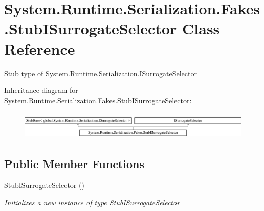 \hypertarget{class_system_1_1_runtime_1_1_serialization_1_1_fakes_1_1_stub_i_surrogate_selector}{\section{System.\-Runtime.\-Serialization.\-Fakes.\-Stub\-I\-Surrogate\-Selector Class Reference}
\label{class_system_1_1_runtime_1_1_serialization_1_1_fakes_1_1_stub_i_surrogate_selector}
}


Stub type of System.\-Runtime.\-Serialization.\-I\-Surrogate\-Selector 


Inheritance diagram for System.\-Runtime.\-Serialization.\-Fakes.\-Stub\-I\-Surrogate\-Selector\-:\begin{figure}[H]
\begin{center}
\leavevmode
\includegraphics[height=1.379310cm]{class_system_1_1_runtime_1_1_serialization_1_1_fakes_1_1_stub_i_surrogate_selector}
\end{center}
\end{figure}
\subsection*{Public Member Functions}
\begin{DoxyCompactItemize}
\item 
\hyperlink{class_system_1_1_runtime_1_1_serialization_1_1_fakes_1_1_stub_i_surrogate_selector_ab14fe849b382670ce977cb507998b147}{Stub\-I\-Surrogate\-Selector} ()
\begin{DoxyCompactList}\small\item\em Initializes a new instance of type \hyperlink{class_system_1_1_runtime_1_1_serialization_1_1_fakes_1_1_stub_i_surrogate_selector}{Stub\-I\-Surrogate\-Selector}\end{DoxyCompactList}\end{DoxyCompactItemize}
